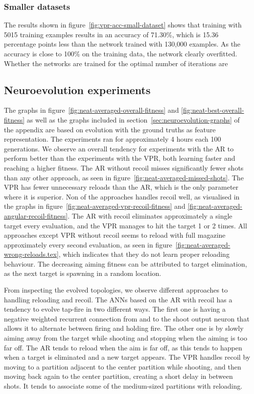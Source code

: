 \subsubsection{Smaller datasets}
The results shown in figure~\ref{fig:vpr-acc-small-dataset} shows that training with 5015 training examples results in an accuracy of 71.30\%, which is 15.36 percentage points less than the network trained with 130,000 examples. As the accuracy is close to 100\% on the training data, the network clearly overfitted. Whether the networks are trained for the optimal number of  iterations are 



\subsection{Neuroevolution experiments}
\label{sec:neuroevolution-experiments-results}
The graphs in figure~\ref{fig:neat-averaged-overall-fitness} and \ref{fig:neat-best-overall-fitness} as well as the graphs included in section~\ref{sec:neuroevolution-graphs} of the appendix are based on evolution with the ground truths as feature representation. The experiments ran for approximately 4 hours each 100 generations. We observe an overall tendency for experiments with the AR to perform better than the experiments with the VPR, both learning faster and reaching a higher fitness. The AR without recoil misses significantly fewer shots than any other approach, as seen in figure~\ref{fig:neat-averaged-missed-shots}. The VPR has fewer unnecessary reloads than the AR, which is the only parameter where it is superior. Non of the approaches  handles recoil well, as visualised in the graphs in figure~\ref{fig:neat-averaged-vpr-recoil-fitness} and \ref{fig:neat-averaged-angular-recoil-fitness}. The AR with recoil eliminates approximately a single target every evaluation, and the VPR manages to hit the target 1 or 2 times. All approaches except VPR without recoil seems to reload with full magazine approximately every second evaluation, as seen in figure~\ref{fig:neat-averaged-wrong-reloads.tex}, which indicates that they do not learn proper reloading behaviour. The decreasing aiming fitness can be attributed to target elimination, as the next target is spawning in a random location.

From inspecting the evolved topologies, we observe different approaches to handling reloading and recoil. The ANNs based on the AR with recoil has a tendency to evolve tap-fire in two different ways. The first one is having a negative weighted recurrent connection from and to the shoot output neuron that allows it to alternate between firing and holding fire. The other one is by slowly aiming away from the target while shooting and stopping when the aiming is too far off. The AR tends to reload when the aim is far off, as this tends to happen when a target is eliminated and a new target appears. The VPR handles recoil by moving to a partition adjacent to the center partition while shooting, and then moving back again to the center partition, creating a short delay in between shots. It tends to associate some of the medium-sized partitions with reloading.


